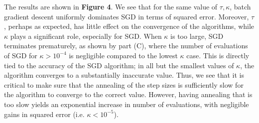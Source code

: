 \documentclass[10pt,psamsfonts]{amsart}
\theoremstyle{definition}
\theoremstyle{remark}
\numberwithin{equation}{section}
\begin{document}
The results are shown in {\bf Figure 4}. We see that for the same value of $\tau, \kappa$, batch gradient descent uniformly dominates SGD in terms of squared error. Moreover, $\tau$, perhaps as expected, has little effect on the convergence of the algorithms, while $\kappa$ plays a significant role, especially for SGD. When $\kappa$ is too large, SGD terminates prematurely, as shown by part (C), where the number of evaluations of SGD for $\kappa > 10^{-4}$ is negligible compared to the lowest $\kappa$ case. This is directly tied to the accuracy of the SGD algorithm; in all but the smallest values of $\kappa$, the algorithm converges to a substantially inaccurate value. Thus, we see that it is critical to make sure that the annealing of the step sizes is sufficiently slow for the algorithm to converge to the correct value. However, having annealing that is too slow yields an exponential increase in number of evaluations, with negligible gains in squared error (i.e. $\kappa < 10^{-5}$).
\end{document}
